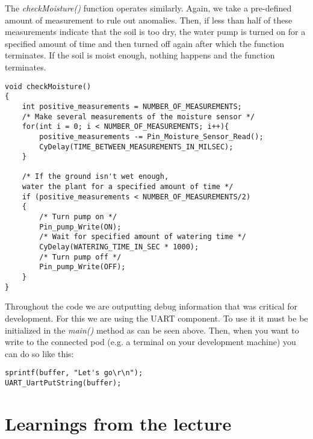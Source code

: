 \documentclass[11pt, oneside]{scrartcl}   	%
\begin{document}
The \emph{checkMoisture()} function operates similarly. Again, we take a pre-defined amount of measurement to rule out anomalies. Then, if less than half of these measurements indicate that the soil is too dry, the water pump is turned on for a specified amount of time and then turned off again after which the function terminates. If the soil is moist enough, nothing happens and the function terminates.
\begin{lstlisting}[frame=single]
void checkMoisture()
{
    int positive_measurements = NUMBER_OF_MEASUREMENTS;
    /* Make several measurements of the moisture sensor */
    for(int i = 0; i < NUMBER_OF_MEASUREMENTS; i++){
        positive_measurements -= Pin_Moisture_Sensor_Read();
        CyDelay(TIME_BETWEEN_MEASUREMENTS_IN_MILSEC);
    }

    /* If the ground isn't wet enough, 
    water the plant for a specified amount of time */
    if (positive_measurements < NUMBER_OF_MEASUREMENTS/2)
    {
        /* Turn pump on */
        Pin_pump_Write(ON);
        /* Wait for specified amount of watering time */
        CyDelay(WATERING_TIME_IN_SEC * 1000);
        /* Turn pump off */
        Pin_pump_Write(OFF);
    }
}
\end{lstlisting}

Throughout the code we are outputting debug information that was critical for development. For this we are using the UART component. To use it it must be be initialized in the \emph{main()} method as can be seen above. Then, when you want to write to the connected pod (e.g. a terminal on your development machine) you can do so like this:

\begin{lstlisting}[frame=single]
sprintf(buffer, "Let's go\r\n");
UART_UartPutString(buffer);
\end{lstlisting}

\section{Learnings from the lecture}
\end{document}
